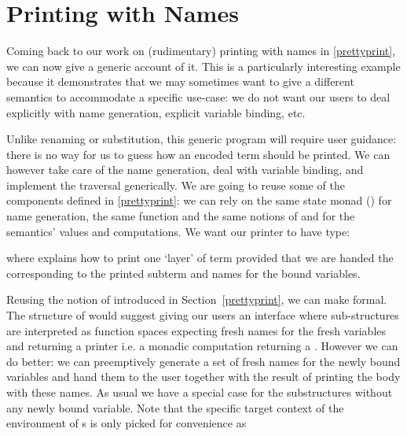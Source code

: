 \section{Printing with Names}\label{section:genericprinting}

Coming back to our work on (rudimentary) printing with names in
\cref{prettyprint}, we can now give a generic account of it. This is a
particularly interesting example because it demonstrates that we may
sometimes want to give  a different semantics to accommodate
a specific use-case: we do not want our users to deal explicitly with
name generation, explicit variable binding, etc.

Unlike renaming or substitution, this generic program will require user
guidance: there is no way for us to guess how an encoded term should be
printed. We can however take care of the name generation, deal with variable
binding, and implement the traversal generically. We are going to reuse
some of the components defined in \cref{prettyprint}: we can rely on the
same state monad () for name generation, the same 
function and the same notions of  and  for the
semantics' values and computations.
%
We want our printer to have type:
\begin{agdasnippet}
\end{agdasnippet}
%
where  explains how to print one `layer' of term provided that
we are handed the  corresponding to the printed subterm and
names for the bound variables.
%
\begin{agdasnippet}
\end{agdasnippet}
%
Reusing the notion of  introduced in Section~\ref{prettyprint},
we can make  formal.
%
The structure of  would suggest giving our users an interface
where sub-structures are interpreted as  function spaces expecting
fresh names for the fresh variables and returning a printer i.e. a monadic
computation returning a . However we can do better: we can
preemptively generate a set of fresh names for the newly bound variables and
hand them to the user together with the result of printing the body with
these names. As usual we have a special case for the substructures without
any newly bound variable. Note that the specific target context of the
environment of s is only picked for convenience as 
